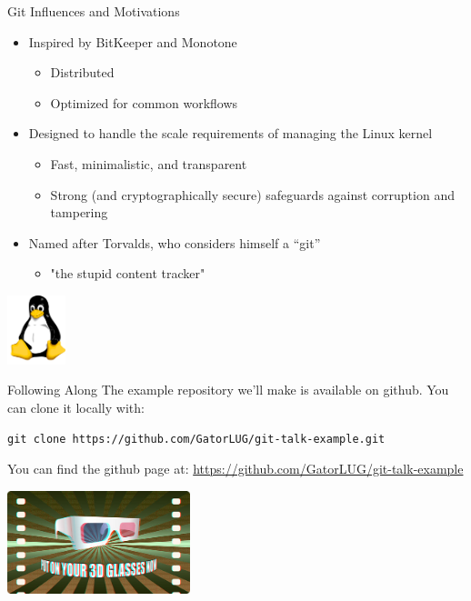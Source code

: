 \documentclass[aspectratio=43]{beamer}
\begin{document}
\begin{frame}{Git Influences and Motivations}
    \begin{itemize}
    \item Inspired by BitKeeper and Monotone
        \begin{itemize}
        \item Distributed
        \item Optimized for common workflows
        \end{itemize}
    \item Designed to handle the scale requirements of managing the Linux kernel
        \begin{itemize}
        \item Fast, minimalistic, and transparent
        \item Strong (and cryptographically secure) safeguards against
            corruption and tampering
        \end{itemize}
    \item Named after Torvalds, who considers himself a ``git''
        \begin{itemize}
        \item "the stupid content tracker"
        \end{itemize}
    \end{itemize}
    \begin{flushright}
        \includegraphics[height=2cm]{resources/tux.pdf}
    \end{flushright}
\end{frame}

\begin{frame}{Following Along}
    The example repository we'll make is available on github. You can clone it
    locally with: \\
    \begin{small}
    \texttt{git clone https://github.com/GatorLUG/git-talk-example.git}
    \end{small}

    You can find the github page at:
    \url{https://github.com/GatorLUG/git-talk-example}
    
    \begin{center}
        \includegraphics[height=3cm]{resources/put_on_3d_glasses.jpg}
    \end{center}
\end{frame}
\end{document}
